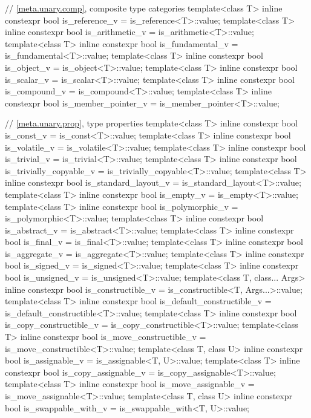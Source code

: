 \begin{codeblock}
{  // \ref{meta.unary.comp}, composite type categories
  template<class T>
    inline constexpr bool is_reference_v = is_reference<T>::value;
  template<class T>
    inline constexpr bool is_arithmetic_v = is_arithmetic<T>::value;
  template<class T>
    inline constexpr bool is_fundamental_v = is_fundamental<T>::value;
  template<class T>
    inline constexpr bool is_object_v = is_object<T>::value;
  template<class T>
    inline constexpr bool is_scalar_v = is_scalar<T>::value;
  template<class T>
    inline constexpr bool is_compound_v = is_compound<T>::value;
  template<class T>
    inline constexpr bool is_member_pointer_v = is_member_pointer<T>::value;

  // \ref{meta.unary.prop}, type properties
  template<class T>
    inline constexpr bool is_const_v = is_const<T>::value;
  template<class T>
    inline constexpr bool is_volatile_v = is_volatile<T>::value;
  template<class T>
    inline constexpr bool is_trivial_v = is_trivial<T>::value;
  template<class T>
    inline constexpr bool is_trivially_copyable_v = is_trivially_copyable<T>::value;
  template<class T>
    inline constexpr bool is_standard_layout_v = is_standard_layout<T>::value;
  template<class T>
    inline constexpr bool is_empty_v = is_empty<T>::value;
  template<class T>
    inline constexpr bool is_polymorphic_v = is_polymorphic<T>::value;
  template<class T>
    inline constexpr bool is_abstract_v = is_abstract<T>::value;
  template<class T>
    inline constexpr bool is_final_v = is_final<T>::value;
  template<class T>
    inline constexpr bool is_aggregate_v = is_aggregate<T>::value;
  template<class T>
    inline constexpr bool is_signed_v = is_signed<T>::value;
  template<class T>
    inline constexpr bool is_unsigned_v = is_unsigned<T>::value;
  template<class T, class... Args>
    inline constexpr bool is_constructible_v = is_constructible<T, Args...>::value;
  template<class T>
    inline constexpr bool is_default_constructible_v = is_default_constructible<T>::value;
  template<class T>
    inline constexpr bool is_copy_constructible_v = is_copy_constructible<T>::value;
  template<class T>
    inline constexpr bool is_move_constructible_v = is_move_constructible<T>::value;
  template<class T, class U>
    inline constexpr bool is_assignable_v = is_assignable<T, U>::value;
  template<class T>
    inline constexpr bool is_copy_assignable_v = is_copy_assignable<T>::value;
  template<class T>
    inline constexpr bool is_move_assignable_v = is_move_assignable<T>::value;
  template<class T, class U>
    inline constexpr bool is_swappable_with_v = is_swappable_with<T, U>::value;
}
\end{codeblock}
